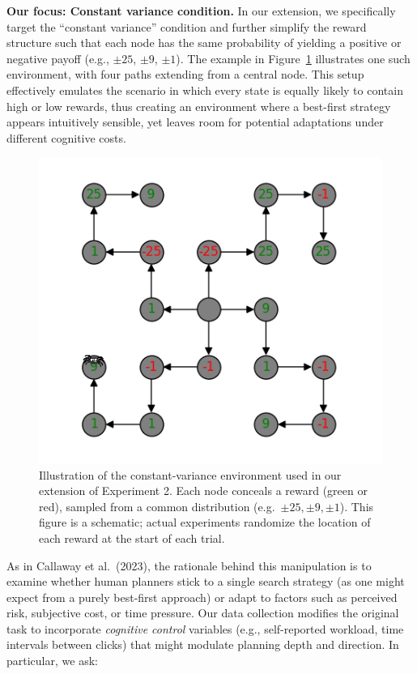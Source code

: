 \documentclass[a4paper,12pt,oneside,article]{memoir}
\begin{document}
\vspace{0.5em}\noindent
\textbf{Our focus: Constant variance condition.}
In our extension, we specifically target the “constant variance” condition and further simplify the reward structure such that each node has the same probability of yielding a positive or negative payoff (e.g., ${\pm}25$, ${\pm}9$, ${\pm}1$). The example in Figure~\ref{fig:constant_env} illustrates one such environment, with four paths extending from a central node. This setup effectively emulates the scenario in which every state is equally likely to contain high or low rewards, thus creating an environment where a best-first strategy appears intuitively sensible, yet leaves room for potential adaptations under different cognitive costs.

\begin{figure}[h]
    \centering
    \includegraphics[width=0.6\linewidth]{image1.png}
    \caption{Illustration of the constant-variance environment used in our extension of Experiment 2. Each node conceals a reward (green or red), sampled from a common distribution (e.g.\ $\pm 25, \pm 9, \pm 1$). This figure is a schematic; actual experiments randomize the location of each reward at the start of each trial.}
    \label{fig:constant_env}
\end{figure}

As in Callaway et al.\ (2023), the rationale behind this manipulation is to examine whether human planners stick to a single search strategy (as one might expect from a purely best-first approach) or adapt to factors such as perceived risk, subjective cost, or time pressure. Our data collection modifies the original task to incorporate \emph{cognitive control} variables (e.g., self-reported workload, time intervals between clicks) that might modulate planning depth and direction. In particular, we ask:
\end{document}
